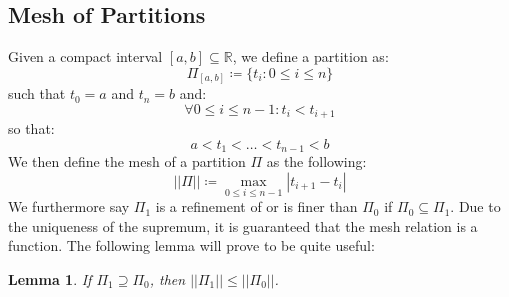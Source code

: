 \documentclass[10pt,letterpaper]{article} %
\newtheorem{lem}{Lemma}[section]
\begin{document}
\subsection{Mesh of Partitions}
Given a compact interval $[a, b] \subseteq \mathbb{R}$, we define a partition as:
\begin{equation*}
\Pi_{[a, b]} \coloneq \{t_i : 0 \leqslant i \leqslant n\}
\end{equation*}
such that $t_0 = a$ and $t_n = b$ and:
\begin{equation*}
\forall 0 \leqslant i \leqslant n-1: t_i < t_{i+1}
\end{equation*}
so that:
\begin{equation*}
a < t_1 < \dots < t_{n-1} < b
\end{equation*}
We then define the mesh of a partition $\Pi$ as the following:
\begin{equation*}
||\Pi|| \coloneq \max_{0 \leqslant i \leqslant n-1}|t_{i+1} - t_i|
\end{equation*}
We furthermore say $\Pi_1$ is a refinement of or is finer than $\Pi_0$ if $\Pi_0 \subseteq \Pi_1$. Due to the uniqueness of the supremum, it is guaranteed that the mesh relation is a function. The following lemma will prove to be quite useful:
\begin{lem}
If $\Pi_1 \supseteq \Pi_0$, then $||\Pi_1|| \leqslant ||\Pi_0||$.
\end{lem}
\end{document}
